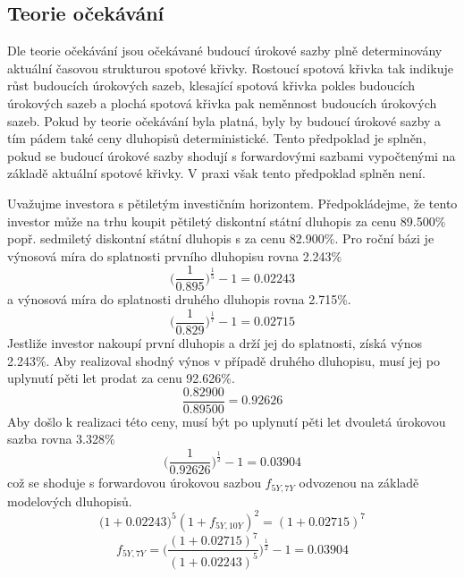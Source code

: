 \documentclass[a4paper]{book}
\begin{document}
\subsection{Teorie očekávání}

Dle teorie očekávání jsou očekávané budoucí úrokové sazby plně determinovány aktuální časovou strukturou spotové křivky. Rostoucí spotová křivka tak indikuje růst budoucích úrokových sazeb, klesající spotová křivka pokles budoucích úrokových sazeb a plochá spotová křivka pak neměnnost budoucích úrokových sazeb. Pokud by teorie očekávání byla platná, byly by budoucí úrokové sazby a tím pádem také ceny dluhopisů deterministické. Tento předpoklad je splněn, pokud se budoucí úrokové sazby shodují s forwardovými sazbami vypočtenými na základě aktuální spotové křivky. V praxi však tento předpoklad splněn není.

Uvažujme investora s pětiletým investičním horizontem. Předpokládejme, že tento investor může na trhu koupit pětiletý diskontní státní dluhopis za cenu 89.500\% popř. sedmiletý diskontní státní dluhopis s za cenu 82.900\%. Pro roční bázi je výnosová míra do splatnosti prvního dluhopisu rovna 2.243\% 
\begin{equation*}
\Big( \frac{1}{0.895} \Big)^\frac{1}{5} - 1 = 0.02243
\end{equation*}
a výnosová míra do splatnosti druhého dluhopis rovna 2.715\%.
\begin{equation*}
\Big( \frac{1}{0.829} \Big)^\frac{1}{7} - 1 = 0.02715
\end{equation*}
Jestliže investor nakoupí první dluhopis a drží jej do splatnosti, získá výnos 2.243\%. Aby realizoval shodný výnos v případě druhého dluhopisu, musí jej po uplynutí pěti let prodat za cenu 92.626\%.
\begin{equation*}
\frac{0.82900}{0.89500} = 0.92626
\end{equation*}
Aby došlo k realizaci této ceny, musí být po uplynutí pěti let dvouletá úrokovou sazba rovna 3.328\%
\begin{equation*}
\Big( \frac{1}{0.92626} \Big)^\frac{1}{2} - 1 = 0.03904
\end{equation*}
což se shoduje s forwardovou úrokovou sazbou $f_{5Y, 7Y}$ odvozenou na základě modelových dluhopisů.
\begin{equation*}
\big(1 + 0.02243)^5 (1 + f_{5Y,10Y})^2 = (1 + 0.02715)^7
\end{equation*}
\begin{equation*}
f_{5Y, 7Y} = \Bigg(\frac{(1 + 0.02715)^7}{(1 + 0.02243)^5}\Bigg)^\frac{1}{2} - 1 = 0.03904
\end{equation*}
\end{document}
